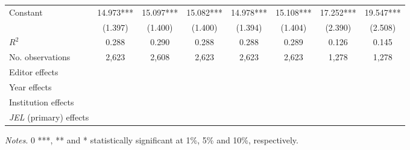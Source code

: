 \begin{table}
\begin{adjustwidth}{-0.085cm}{}
\begin{threeparttable}
\begin{tabular}{p{2.64cm}SSSSSSS}
            Constant                      &      14.973***&      15.097***&      15.082***&      14.978***&      15.108***&      17.252***&      19.547***\\
                                          &     (1.397)   &     (1.400)   &     (1.400)   &     (1.394)   &     (1.404)   &     (2.390)   &     (2.508)   \\
            \midrule
            \(R^2\)                       &       0.288   &       0.290   &       0.288   &       0.288   &       0.289   &       0.126   &       0.145   \\
            No. observations              &       2,623   &       2,608   &       2,623   &       2,623   &       2,623   &       1,278   &       1,278   \\
            \midrule
            Editor effects        &           {}   &           {}   &           {}   &           {}   &           {}   &           {}   &           {}   \\
            Year effects                  &           {}   &           {}   &           {}   &           {}   &           {}   &           {}   &           {}   \\
            Institution effects           &           {}   &           {}   &           {}   &           {}   &           {}   &           {}   &           {}   \\
            \textit{JEL} (primary) effects&               &               &               &               &               &               &           {}   \\
            \bottomrule
        \end{tabular}
        \begin{tablenotes}
            \tiny
            \item \textit{Notes}. 0 ***, ** and * statistically significant at 1\%, 5\% and 10\%, respectively.
        \end{tablenotes}
    \end{threeparttable}
    \end{adjustwidth}
\end{table}